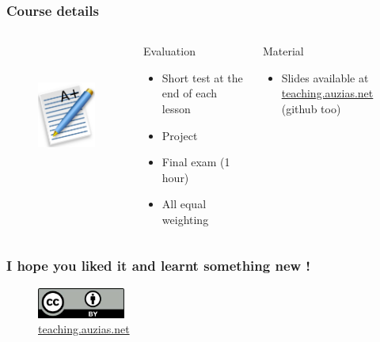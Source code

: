 \documentclass[]{beamer}
\begin{document}
  \begin{frame}
    \frametitle{Course details}
    \begin{columns}
        \begin{figure}[t]
          \centering
          \includegraphics[height=4cm]{./imgs/grade.pdf}
          \label{fig:marks}
        \end{figure}
        \begin{block}{Evaluation}
          \begin{itemize}
            \item Short test at the end of each lesson
            \item Project
            \item Final exam (1 hour)
            \item All equal weighting
          \end{itemize}
        \end{block}
        \begin{block}{Material}
          \begin{itemize}
            \item Slides available at \color{blue}\href{http://teaching.auzias.net}{teaching.auzias.net} \color{black} (github too)
          \end{itemize}
        \end{block}
    \end{columns}
  \end{frame}









%    

\begin{frame}
    \frametitle{I hope you liked it and learnt something new !}
  \begin{figure}[p]
      \centering
      \includegraphics[height=1cm]{./imgs/cc40.jpg}
      \caption{\color{blue}\href{http://teaching.auzias.net}{teaching.auzias.net}}
    \label{fig:cc40}
  \end{figure}
\end{frame}
\end{document}
